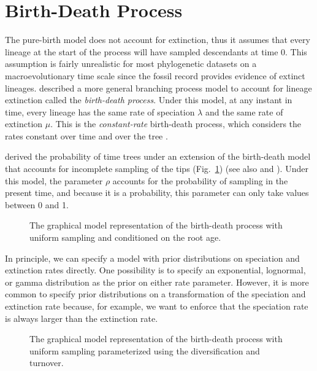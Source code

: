 \bigskip
\section{Birth-Death Process}\label{birthDeathSec}

The pure-birth model does not account for  extinction, thus it assumes that every lineage at the start of the process will have sampled descendants at time 0.
This assumption is fairly unrealistic for most phylogenetic datasets on a macroevolutionary time scale since the fossil record provides evidence of extinct lineages.
\citet{Kendall1948} described a more general branching process model to account for lineage extinction called the \emph{birth-death process}.
Under this model, at any instant in time, every lineage has the same rate of speciation $\lambda$ and the same rate of extinction $\mu$.
This is the \emph{constant-rate} birth-death process, which considers the rates constant over time and over the tree \citep{Nee1994b,Hoehna2015a}.

\citet{Yang1997} derived the probability of time trees under an extension of the birth-death model that accounts for incomplete sampling of the tips (Fig.~\ref{bdrGMFig1}) (see also \cite{Stadler2009} and \cite{Hoehna2014a}). 
Under this model, the parameter $\rho$ accounts for the probability of sampling in the present time, and because it is a probability, this parameter can only take values between 0 and 1. 
\begin{figure}[h!]
\centering
{}
\caption{\small The graphical model representation of the birth-death process with uniform sampling and conditioned on the root age.}
\label{bdrGMFig1}
\end{figure}

In principle, we can specify a model with prior distributions on speciation and extinction rates directly.
One possibility is to specify an exponential, lognormal, or gamma distribution as the prior on either rate parameter.
However, it is more common to specify prior distributions on a transformation of the speciation and extinction rate because, for example, we want to enforce that the speciation rate is always larger than the extinction rate.


\begin{figure}[h!]
\centering
{}
\caption{\small The graphical model representation of the birth-death process with uniform sampling parameterized using the diversification and turnover.}
\label{bdrGMFig2}
\end{figure}


